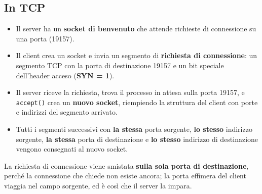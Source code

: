 \subsection{In TCP}

\begin{itemize}
    \item Il server ha un \textbf{socket di benvenuto} che attende richieste di connessione su una porta
          (19157).
    \item Il client crea un socket e invia un segmento di \textbf{richiesta di connessione}: un segmento TCP con la
          porta di destinazione 19157 e un bit speciale dell'header acceso (\textbf{SYN = 1}).
    \item Il server riceve la richiesta, trova il processo in attesa sulla porta 19157, e \texttt{accept()} crea un
          \textbf{nuovo socket}, riempiendo la struttura del client con porte e indirizzi del segmento arrivato.
    \item Tutti i segmenti successivi con \textbf{la stessa} porta sorgente, \textbf{lo stesso} indirizzo
          sorgente, \textbf{la stessa} porta di destinazione e \textbf{lo stesso} indirizzo di destinazione vengono consegnati al
          nuovo socket.
\end{itemize}


La richiesta di connessione viene smistata \textbf{sulla sola porta di destinazione}, perché la connessione che chiede
non esiste ancora; la porta effimera del client viaggia nel campo sorgente, ed è così che il server la impara.


